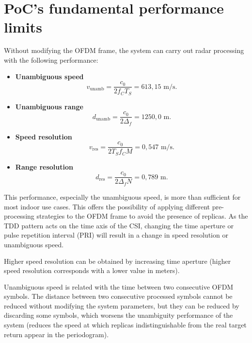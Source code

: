 \section{PoC's fundamental performance limits}

Without modifying the OFDM frame, the system can carry out radar processing with the following performance:

\begin{itemize}
	\item \textbf{Unambiguous speed}
	\vspace{-\baselineskip} %
	\begin{equation}
		v_{\text{unamb}} = \frac{c_0}{2f_C T_S} = 613,15\text{ m/s}.
	\end{equation}
	
	\item \textbf{Unambiguous range}
	\begin{equation}
		d_{\text{unamb}} = \frac{c_0}{2\Delta_f} = 1250,0\text{ m}.
	\end{equation}
	\item \textbf{Speed resolution}
	\begin{equation}
		v_{\text{res}} = \frac{c_0}{2T_Sf_CM} = 0,547 \text{ m/s}.
	\end{equation} 
	\item \textbf{Range resolution}
	\begin{equation}
		d_{\text{res}} = \frac{c_0}{2\Delta_fN} = 0,789 \text{ m}.
	\end{equation}  
\end{itemize}
	
	This performance, especially the unambiguous speed, is more than sufficient for most indoor use cases. 
	This offers the possibility of applying different pre-processing strategies to the OFDM frame to avoid the presence of replicas. 
	As the TDD pattern acts on the time axis of the CSI, changing the time aperture or pulse repetition interval (PRI) will result in a change in speed resolution or unambiguous speed.
	
	Higher speed resolution can be obtained by increasing time aperture (higher speed resolution corresponds with a lower value in meters).
	
	Unambiguous speed is related with the time between two consecutive OFDM symbols. The distance between two consecutive processed symbols cannot be reduced without modifying the system parameters, but they can be reduced by discarding some symbols, which worsens the unambiguity performance of the system (reduces the speed at which replicas indistinguishable from the real target return appear in the periodogram).
	
